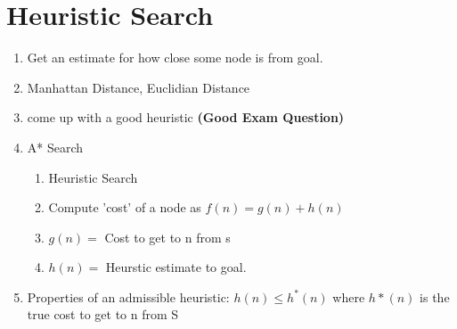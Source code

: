 \documentclass{article}
\begin{document}
\section{Heuristic Search}
\begin{enumerate}
	\item Get an estimate for how close some node is from goal.
	\item Manhattan Distance, Euclidian Distance
	\item come up with a good heuristic \textbf{(Good Exam Question)}
	\item A* Search
	\begin{enumerate}
		\item Heuristic Search
		\item Compute 'cost' of a node as $f(n) = g(n) + h(n)$
		\item $g(n) = $ Cost to get to n from s
		\item $h(n) = $ Heurstic estimate to goal.
	\end{enumerate}
	\item Properties of an admissible heuristic: $h(n) \leq h^*(n)$ where $h*(n)$
		is the true cost to get to n from S
\end{enumerate}
\end{document}
